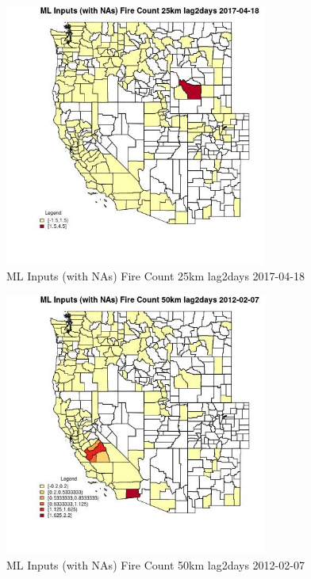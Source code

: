 \begin{figure} 
\centering  
\includegraphics[width=0.77\textwidth]{Code_Outputs/Report_ML_input_PM25_Step4_part_f_de_duplicated_aves_prioritize_24hr_obswNAs_CountyFire_Count_25km_lag2daysMean2017-04-18.jpg} 
\caption{\label{fig:Report_ML_input_PM25_Step4_part_f_de_duplicated_aves_prioritize_24hr_obswNAsCountyFire_Count_25km_lag2daysMean2017-04-18}ML Inputs (with NAs) Fire Count 25km lag2days 2017-04-18} 
\end{figure} 
 

\begin{figure} 
\centering  
\includegraphics[width=0.77\textwidth]{Code_Outputs/Report_ML_input_PM25_Step4_part_f_de_duplicated_aves_prioritize_24hr_obswNAs_CountyFire_Count_50km_lag2daysMean2012-02-07.jpg} 
\caption{\label{fig:Report_ML_input_PM25_Step4_part_f_de_duplicated_aves_prioritize_24hr_obswNAsCountyFire_Count_50km_lag2daysMean2012-02-07}ML Inputs (with NAs) Fire Count 50km lag2days 2012-02-07} 
\end{figure} 
 

